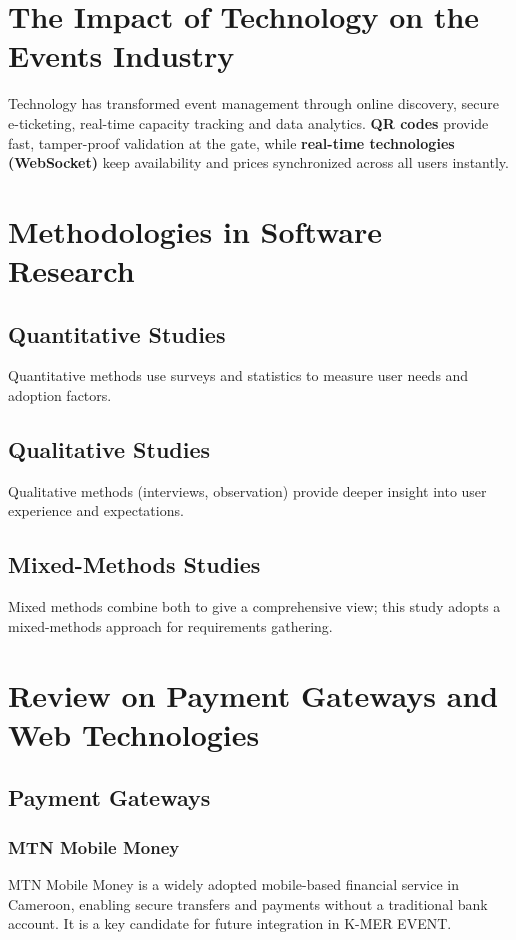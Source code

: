 \documentclass[12pt,a4paper]{report}
\begin{document}
\section{The Impact of Technology on the Events Industry}
Technology has transformed event management through online discovery, secure e-ticketing,
real-time capacity tracking and data analytics. \textbf{QR codes} provide fast, tamper-proof
validation at the gate, while \textbf{real-time technologies (WebSocket)} keep availability
and prices synchronized across all users instantly.

\section{Methodologies in Software Research}
\subsection{Quantitative Studies}
Quantitative methods use surveys and statistics to measure user needs and adoption factors.

\subsection{Qualitative Studies}
Qualitative methods (interviews, observation) provide deeper insight into user experience and
expectations.

\subsection{Mixed-Methods Studies}
Mixed methods combine both to give a comprehensive view; this study adopts a mixed-methods
approach for requirements gathering.

\section{Review on Payment Gateways and Web Technologies}
\subsection{Payment Gateways}
\subsubsection{MTN Mobile Money}
MTN Mobile Money is a widely adopted mobile-based financial service in Cameroon, enabling
secure transfers and payments without a traditional bank account. It is a key candidate for
future integration in K-MER EVENT.
\end{document}
